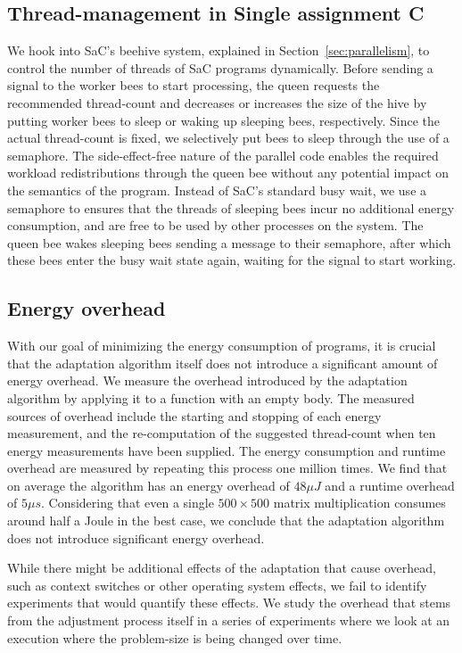 \documentclass[runningheads]{llncs}
\begin{document}
\subsection{Thread-management in Single assignment C}\label{sec:implementation-sac}
We hook into SaC's beehive system, explained in Section~\ref{sec:parallelism}, to control the number of threads of SaC programs dynamically.
Before sending a signal to the worker bees to start processing, the queen requests the recommended thread-count and decreases or increases the size of the hive by putting worker bees to sleep or waking up sleeping bees, respectively.
Since the actual thread-count is fixed, we selectively put bees to sleep through the use of a semaphore.
The side-effect-free nature of the parallel code enables the required workload redistributions through the queen bee without any potential impact on the semantics of the program.
Instead of SaC's standard busy wait, we use a semaphore to ensures that the threads of sleeping bees incur no additional energy consumption, and are free to be used by other processes on the system.
The queen bee wakes sleeping bees sending a message to their semaphore, after which these bees enter the busy wait state again, waiting for the signal to start working.

\subsection{Energy overhead}
With our goal of minimizing the energy consumption of programs, it is crucial that the adaptation algorithm itself does not introduce a significant amount of energy overhead.
We measure the overhead introduced by the adaptation algorithm by applying it to a function with an empty body.
The measured sources of overhead include the starting and stopping of each energy measurement, and the re-computation of the suggested thread-count when ten energy measurements have been supplied.
The energy consumption and runtime overhead are measured by repeating this process one million times.
We find that on average the algorithm has an energy overhead of $48\mu{}J$ and a runtime overhead of $5\mu{}s$.
Considering that even a single $500 \times 500$ matrix multiplication consumes around half a Joule in the best case, we conclude that the adaptation algorithm does not introduce significant energy overhead.

While there might be additional effects of the adaptation that cause overhead, such as context switches or other operating system effects, we fail to identify experiments that would quantify these effects.
We study the overhead that stems from the adjustment process itself in a series of experiments where we look at an execution where the problem-size is being changed over time.
\end{document}
